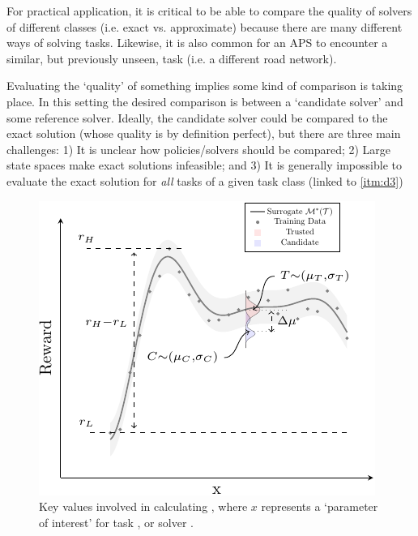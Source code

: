     For practical application, it is critical to be able to compare the quality of solvers of different classes (i.e. exact vs. approximate) because there are many different ways of solving tasks. Likewise, it is also common for an APS to encounter a similar, but previously unseen, task (i.e. a different road network).
    
    Evaluating the `quality' of something implies some kind of comparison is taking place. In this setting the desired comparison is between a `candidate solver' \solve{} and some reference solver. Ideally, the candidate solver could be compared to the exact solution (whose quality is by definition perfect), but there are three main challenges: 1) It is unclear how policies/solvers should be compared; 2) Large state spaces make exact solutions infeasible; and 3) It is generally impossible to evaluate the exact solution for \emph{all} tasks of a given task class \taskclass{} (linked to \ref{itm:d3})
    \begin{figure}[tb]
        \centering
        \includegraphics[width=0.6\linewidth]{Figures/sq_v2_fig-crop}
        \caption{Key values involved in calculating \xQ, where $x$ represents a `parameter of interest' for task \task, or solver \solve.}
        \label{fig:sq_v2}
        \vspace{-0.2cm}
    \end{figure}
